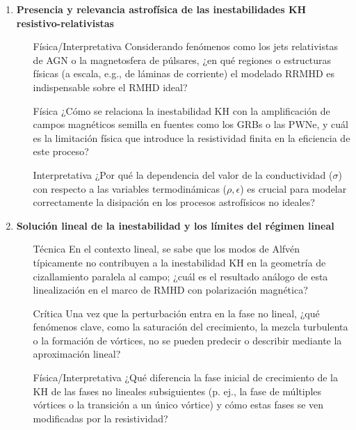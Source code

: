 \begin{enumerate}
    \item \textbf{Presencia y relevancia astrofísica de las inestabilidades KH resistivo-relativistas}
    \begin{itemize}
        \item [Física/Interpretativa] Considerando fenómenos como los jets relativistas de AGN o la magnetosfera de púlsares, ¿en qué regiones o estructuras físicas (a escala, e.g., de láminas de corriente) el modelado RRMHD es indispensable sobre el RMHD ideal? \cite{350, 352, 403, 404}
        \item [Física] ¿Cómo se relaciona la inestabilidad KH con la amplificación de campos magnéticos semilla en fuentes como los GRBs o las PWNe, y cuál es la limitación física que introduce la resistividad finita en la eficiencia de este proceso? \cite{428}
        \item [Interpretativa] ¿Por qué la dependencia del valor de la conductividad ($\sigma$) con respecto a las variables termodinámicas ($\rho, \epsilon$) es crucial para modelar correctamente la disipación en los procesos astrofísicos no ideales? \cite{363}
    \end{itemize}

    \item \textbf{Solución lineal de la inestabilidad y los límites del régimen lineal}
    \begin{itemize}
        \item [Técnica] En el contexto lineal, se sabe que los modos de Alfvén típicamente no contribuyen a la inestabilidad KH en la geometría de cizallamiento paralela al campo; ¿cuál es el resultado análogo de esta linealización en el marco de RMHD con polarización magnética? \cite{433}
        \item [Crítica] Una vez que la perturbación entra en la fase no lineal, ¿qué fenómenos clave, como la saturación del crecimiento, la mezcla turbulenta o la formación de vórtices, no se pueden predecir o describir mediante la aproximación lineal? \cite{325, 322, 382}
        \item [Física/Interpretativa] ¿Qué diferencia la fase inicial de crecimiento de la KH de las fases no lineales subsiguientes (p. ej., la fase de múltiples vórtices o la transición a un único vórtice) y cómo estas fases se ven modificadas por la resistividad? \cite{322, 325, 382}
    \end{itemize}


\end{enumerate}
